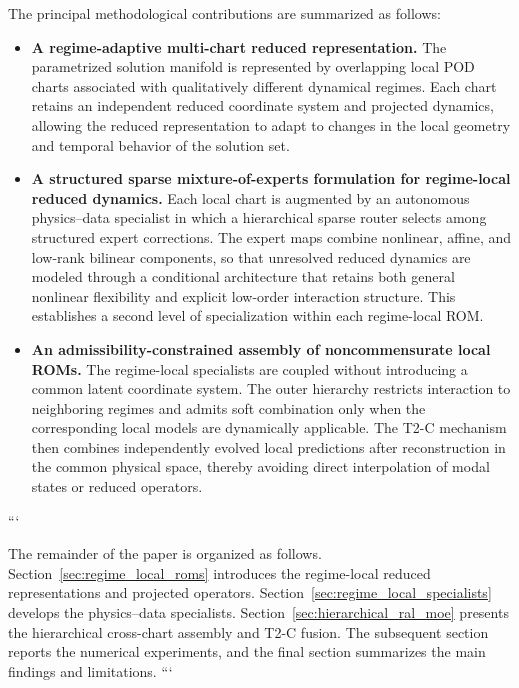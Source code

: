 The principal methodological contributions are summarized as follows:
\begin{itemize}

\item \textbf{A regime-adaptive multi-chart reduced representation.}
The parametrized solution manifold is represented by overlapping local POD
charts associated with qualitatively different dynamical regimes. Each chart
retains an independent reduced coordinate system and projected dynamics,
allowing the reduced representation to adapt to changes in the local
geometry and temporal behavior of the solution set.

\item \textbf{A structured sparse mixture-of-experts formulation for
regime-local reduced dynamics.}
Each local chart is augmented by an autonomous physics--data specialist in
which a hierarchical sparse router selects among structured expert
corrections. The expert maps combine nonlinear, affine, and low-rank
bilinear components, so that unresolved reduced dynamics are modeled through
a conditional architecture that retains both general nonlinear flexibility
and explicit low-order interaction structure. This establishes a second
level of specialization within each regime-local ROM.

\item \textbf{An admissibility-constrained assembly of noncommensurate
local ROMs.}
The regime-local specialists are coupled without introducing a common latent
coordinate system. The outer hierarchy restricts interaction to neighboring
regimes and admits soft combination only when the corresponding local models
are dynamically applicable. The T2-C mechanism then combines independently
evolved local predictions after reconstruction in the common physical space,
thereby avoiding direct interpolation of modal states or reduced operators.

\end{itemize}
```


The remainder of the paper is organized as follows.
Section~\ref{sec:regime_local_roms} introduces the regime-local reduced
representations and projected operators.
Section~\ref{sec:regime_local_specialists} develops the physics--data
specialists.
Section~\ref{sec:hierarchical_ral_moe} presents the hierarchical
cross-chart assembly and T2-C fusion.
The subsequent section reports the numerical experiments, and the final
section summarizes the main findings and limitations.
```





















